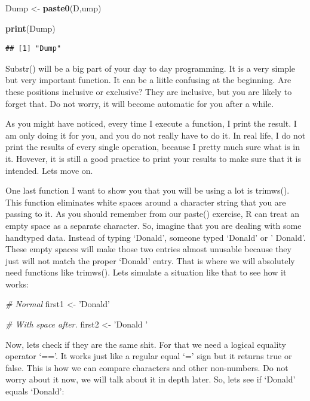 \documentclass[]{book}
\newenvironment{Shaded}{\begin{snugshade}}{\end{snugshade}}
\newcommand{\CommentTok}[1]{\textcolor[rgb]{0.56,0.35,0.01}{\textit{#1}}}
\newcommand{\KeywordTok}[1]{\textcolor[rgb]{0.13,0.29,0.53}{\textbf{#1}}}
\newcommand{\NormalTok}[1]{#1}
\newcommand{\StringTok}[1]{\textcolor[rgb]{0.31,0.60,0.02}{#1}}
\begin{document}
\begin{Shaded}
\begin{Highlighting}[]
\NormalTok{Dump <-}\StringTok{ }\KeywordTok{paste0}\NormalTok{(D,ump)}

\KeywordTok{print}\NormalTok{(Dump)}
\end{Highlighting}
\end{Shaded}

\begin{verbatim}
## [1] "Dump"
\end{verbatim}

Substr() will be a big part of your day to day programming. It is a very simple but very important function. It can be a liitle confusing at the beginning. Are these positions inclusive or exclusive? They are inclusive, but you are likely to forget that. Do not worry, it will become automatic for you after a while.

As you might have noticed, every time I execute a function, I print the result. I am only doing it for you, and you do not really have to do it. In real life, I do not print the results of every single operation, because I pretty much sure what is in it. Hovever, it is still a good practice to print your results to make sure that it is intended. Lets move on.

One last function I want to show you that you will be using a lot is trimws(). This function eliminates white spaces around a character string that you are passing to it. As you should remember from our paste() exercise, R can treat an empty space as a separate character. So, imagine that you are dealing with some handtyped data. Instead of typing `Donald', someone typed `Donald' or ' Donald'. These empty spaces will make those two entries almost unusable because they just will not match the proper `Donald' entry. That is where we will absolutely need functions like trimws(). Lets simulate a situation like that to see how it works:

\begin{Shaded}
\begin{Highlighting}[]
\CommentTok{# Normal}
\NormalTok{first1 <-}\StringTok{ 'Donald'}

\CommentTok{# With space after.}
\NormalTok{first2 <-}\StringTok{ 'Donald '}
\end{Highlighting}
\end{Shaded}

Now, lets check if they are the same shit. For that we need a logical equality operator `=='. It works just like a regular equal `=' sign but it returns true or false. This is how we can compare characters and other non-numbers. Do not worry about it now, we will talk about it in depth later. So, lets see if `Donald' equals `Donald':
\end{document}
